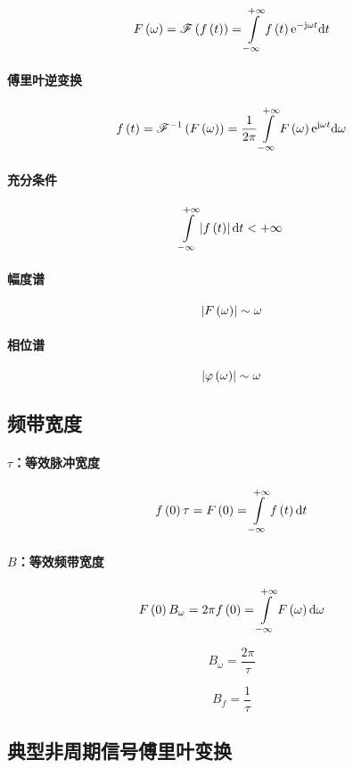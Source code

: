 \documentclass{article}
\begin{document}
\[F\pare{\omega}=\fourier\ft=\impint\ft\e^{-\j\omega t}\d t\]

\paragraph{傅里叶逆变换}

\[\ft=\tfourier{F\pare{\omega}}=\frac1{2\pi}\impint F\pare{\omega}\e^{\j\omega t}\d\omega\]

\paragraph{充分条件}

\[\impint\abs\ft\d t<+\infty\]

\paragraph{幅度谱}

\[\abs{F\pare{\omega}}\sim \omega\]

\paragraph{相位谱}

\[\abs{\varphi\pare{\omega}}\sim \omega\]

\subsection{频带宽度}

\paragraph{$\tau$：等效脉冲宽度}

\[f\pare{0}\tau=F\pare{0}=\impint\ft\d t\]

\paragraph{$B$：等效频带宽度}

\[F\pare{0}B_\omega=2\pi f\pare{0}=\impint F\pare{\omega}\d\omega\]

\[B_\omega=\frac{2\pi}\tau\]

\[B_f=\frac1\tau\]

\subsection{典型非周期信号傅里叶变换}
\end{document}
